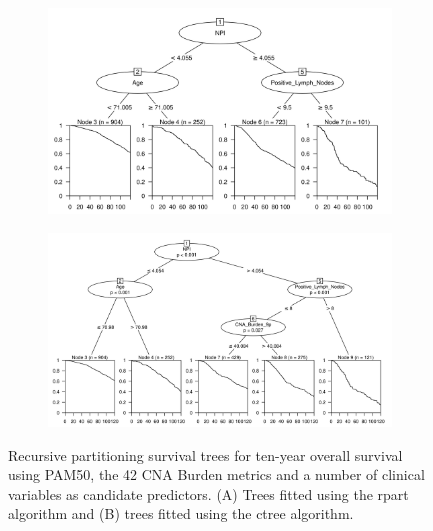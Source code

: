 \begin{figure}[!htb]
\centering

\vspace{1cm}

\begin{subfigure}{\textwidth}
\subcaption{}
\includegraphics[width=1\textwidth]{../figures/Appendices/Appendix_B/Clin_PA_PartyKit_Survival_Burden_TenYearOS_PAM50.png}
\end{subfigure}

\vspace{2cm}

\begin{subfigure}{\textwidth}
\subcaption{}
\includegraphics[width=1\textwidth]{../figures/Appendices/Appendix_B/Clin_PA_Ctree_Survival_Burden_TenYearOS_PAM50.png}
\end{subfigure}

\vspace{1cm}

\caption[Recursive partitioning survival trees for ten-year overall survival using PAM50, the 42 CNA Burden metrics and a number of clinical variables as candidate predictors.]{Recursive partitioning survival trees for ten-year overall survival using PAM50, the 42 CNA Burden metrics and a number of clinical variables as candidate predictors. (A) Trees fitted using the rpart algorithm and (B) trees fitted using the ctree algorithm.}
\end{figure}

